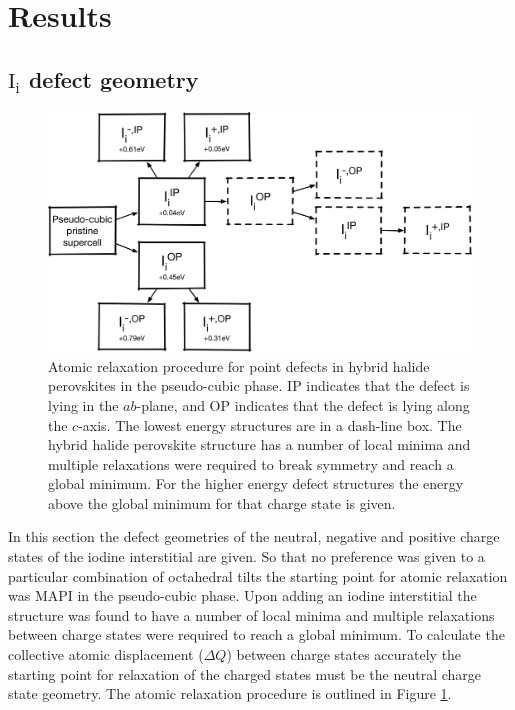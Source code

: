 \section{Results} \label{ch:6-results}

\subsection{$\mathrm{I}_\mathrm{i}$ defect geometry}

\begin{figure}[h!]
\centering
  \includegraphics[width=0.7\columnwidth]{figures/ch6/relaxation_workflow.png}
  \caption[Atomic relaxation procedure for point defects in hybrid halide perovskites]{Atomic relaxation procedure for point defects in hybrid halide perovskites in the pseudo-cubic phase. IP indicates that the defect is lying in the $ab$-plane, and OP indicates that the defect is lying along the $c$-axis. The lowest energy structures are in a dash-line box. The hybrid halide perovskite structure has a number of local minima and multiple relaxations were required to break symmetry and reach a global minimum. For the higher energy defect structures the energy above the global minimum for that charge state is given.}
\label{relaxation_workflow}
\end{figure}

In this section the defect geometries of the neutral, negative and positive charge states of the iodine interstitial are given. So that no preference was given to a particular combination of octahedral tilts the starting point for atomic relaxation was MAPI in the pseudo-cubic phase. Upon adding an iodine interstitial the structure was found to have a number of local minima and multiple relaxations between charge states were required to reach a global minimum. To calculate the collective atomic displacement ($\Delta Q$) between charge states accurately the starting point for relaxation of the charged states must be the neutral charge state geometry. The atomic relaxation procedure is outlined in Figure \ref{relaxation_workflow}.

